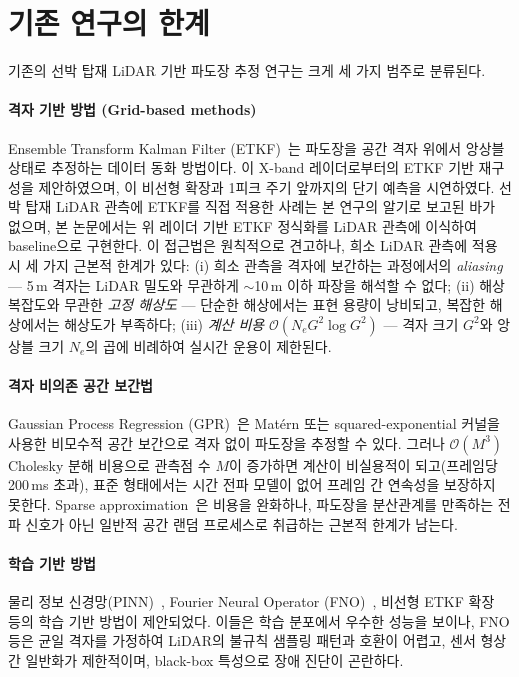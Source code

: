 \documentclass[11pt]{report}
\numberwithin{equation}{chapter}
\numberwithin{figure}{chapter}
\numberwithin{table}{chapter}
\begin{document}
\section{기존 연구의 한계}
\label{sec:prior_limitations}

기존의 선박 탑재 LiDAR 기반 파도장 추정 연구는 크게 세 가지 범주로 분류된다.

\paragraph{격자 기반 방법 (Grid-based methods)}
Ensemble Transform Kalman Filter (ETKF)~\citep{Hunt2007, WangPan2021}는
파도장을 공간 격자 위에서 앙상블 상태로 추정하는 데이터 동화 방법이다.
\citet{Desmars2020}이 X-band 레이더로부터의 ETKF 기반 재구성을 제안하였으며,
\citet{Desmars2023}이 비선형 확장과 1피크 주기 앞까지의 단기 예측을 시연하였다.
선박 탑재 LiDAR 관측에 ETKF를 직접 적용한 사례는 본 연구의 알기로 보고된 바가
없으며, 본 논문에서는 위 레이더 기반 ETKF 정식화를 LiDAR 관측에 이식하여
baseline으로 구현한다.
이 접근법은 원칙적으로 견고하나, 희소 LiDAR 관측에 적용 시 세 가지 근본적 한계가 있다:
(i) 희소 관측을 격자에 보간하는 과정에서의 \emph{aliasing} --- 5\,m 격자는
LiDAR 밀도와 무관하게 $\sim$10\,m 이하 파장을 해석할 수 없다;
(ii) 해상 복잡도와 무관한 \emph{고정 해상도} --- 단순한 해상에서는
표현 용량이 낭비되고, 복잡한 해상에서는 해상도가 부족하다;
(iii) \emph{계산 비용} $\mathcal{O}(N_e G^2 \log G^2)$ --- 격자 크기 $G^2$와
앙상블 크기 $N_e$의 곱에 비례하여 실시간 운용이 제한된다.

\paragraph{격자 비의존 공간 보간법}
Gaussian Process Regression (GPR)~\citep{RasmussenWilliams2006}은
Mat\'{e}rn 또는 squared-exponential 커널을 사용한 비모수적 공간 보간으로
격자 없이 파도장을 추정할 수 있다. 그러나 $\mathcal{O}(M^3)$ Cholesky
분해 비용으로 관측점 수 $M$이 증가하면 계산이 비실용적이 되고(프레임당 200\,ms 초과),
표준 형태에서는 시간 전파 모델이 없어 프레임 간 연속성을 보장하지 못한다.
Sparse approximation~\citep{RasmussenWilliams2006}은 비용을 완화하나,
파도장을 분산관계를 만족하는 전파 신호가 아닌 일반적 공간 랜덤 프로세스로
취급하는 근본적 한계가 남는다.

\paragraph{학습 기반 방법}
물리 정보 신경망(PINN)~\citep{Liu2024}, Fourier Neural Operator
(FNO)~\citep{Ehlers2024}, 비선형 ETKF 확장~\citep{Desmars2023} 등의
학습 기반 방법이 제안되었다. 이들은 학습 분포에서 우수한 성능을 보이나,
FNO 등은 균일 격자를 가정하여 LiDAR의 불규칙 샘플링 패턴과 호환이 어렵고,
센서 형상 간 일반화가 제한적이며, black-box 특성으로 장애 진단이 곤란하다.
\end{document}
